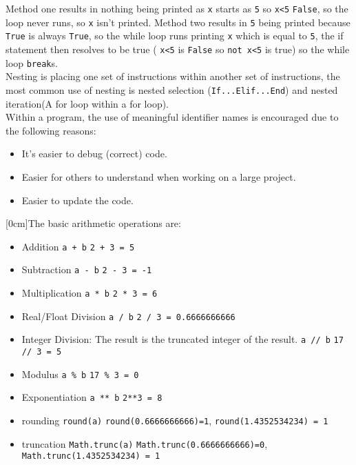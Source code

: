 \documentclass[a4paper]{article}
\begin{document}
			\noindent
			Method one results in nothing being printed as \verb|x| starts as \verb|5| so \verb|x<5| \verb|False|, so the loop never runs, so \verb|x| isn't printed. Method two results in \verb|5| being printed because \verb|True| is always \verb|True|, so the while loop runs printing \verb|x| which is equal to \verb|5|, the if statement then resolves to be true ( \verb|x<5| is \verb|False| so \verb|not x<5| is true) so the while loop \verb|break|s.\\
			Nesting is placing one set of instructions within another set of instructions, the most common use of nesting is nested selection (\verb|If...Elif...End|) and nested iteration(A for loop within a for loop).\\
			Within a program, the use of meaningful identifier names is encouraged due to the following reasons:
			\begin{itemize}
				\setlength\itemsep{0em}
				\item It's easier to debug (correct) code.
				\item Easier for others to understand when working on a large project.
				\item Easier to update the code.
			\end{itemize}
			[0cm]The basic arithmetic operations are:
			\begin{itemize}
				\setlength\itemsep{0em}
				\item Addition \verb|a + b|
					\subitem \verb|2 + 3 = 5|
				\item Subtraction \verb|a - b|
					\subitem \verb|2 - 3 = -1|
				\item Multiplication \verb|a * b|
					\subitem \verb|2 * 3 = 6|
				\item Real/Float Division \verb|a / b|
					\subitem \verb|2 / 3 = 0.6666666666|
				\item Integer Division: The result is the truncated integer of the result. \verb|a // b|
					\subitem \verb|17 // 3 = 5|
				\item Modulus \verb|a % b|
					\subitem \verb|17 % 3 = 0|
				\item Exponentiation \verb|a ** b|
					\subitem \verb|2**3 = 8|
				\item rounding \verb|round(a)|
					\subitem \verb|round(0.6666666666)=1|, \verb|round(1.4352534234) = 1|
				\item truncation \verb|Math.trunc(a)|
					\subitem \verb|Math.trunc(0.6666666666)=0|, \verb|Math.trunc(1.4352534234) = 1|
			\end{itemize}
\end{document}
